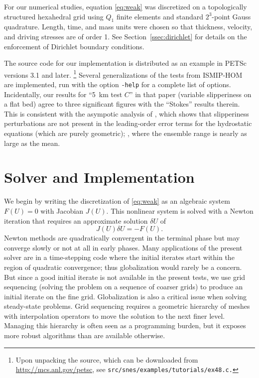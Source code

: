 For our numerical studies, equation \eqref{eq:weak} was discretized on a topologically structured hexahedral grid using $Q_1$ finite elements and standard $2^3$-point Gauss quadrature.  Length, time, and mass units were chosen so that thickness, velocity, and driving stresses are of order 1.  See Section~\ref{ssec:dirichlet} for details on the enforcement of Dirichlet boundary conditions.

The source code for our implementation is distributed as an example in PETSc~\citep{petsc-web-page} versions 3.1 and later.
\footnote{
Upon unpacking the source, which can be downloaded from \url{http://mcs.anl.gov/petsc}, see \texttt{src/snes/examples/tutorials/ex48.c.}
}
Several generalizations of the tests from ISMIP-HOM~\citep{pattyn2008beh} are implemented, run with the option \texttt{-help} for a complete list of options.  Incidentally, our results for ``\SI{5}{\kilo\metre} test $C$'' in that paper (variable slipperiness on a flat bed) agree to three significant figures with the ``Stokes'' results therein.
This is consistent with the asympotic analysis of \citet{schoof2010thin}, which shows that slipperiness perturbations are not present in the leading-order error terms for the hydrostatic equations (which are purely geometric); \cf \citet[Table~4 and Figure~8]{pattyn2008beh}, where the ensemble range is nearly as large as the mean.

\section{Solver and Implementation}\label{sec:solver}
We begin by writing the discretization of \eqref{eq:weak} as an algebraic system $F(U) = 0$ with
Jacobian $J(U)$.  This nonlinear system is solved with a Newton iteration that requires an
approximate solution $\delta U$ of
\begin{equation}\label{eq:newton-step}
  J(U)\delta U = -F(U) .
\end{equation}
Newton methods are quadratically convergent in the terminal phase but may converge slowly or
not at all in early phases.  Many applications of the present solver are in a time-stepping code
where the initial iterates start within the region of quadratic convergence; thus globalization
would rarely be a concern. But since a good initial iterate is not available in the present tests,
we use grid sequencing (solving the problem on a sequence of coarser grids) to produce an initial
iterate on the fine grid.
Globalization is also a critical issue when solving steady-state problems.
Grid sequencing requires a geometric hierarchy of meshes with interpolation operators to move the solution to the next finer level.
Managing this hierarchy is often seen as a programming burden, but it exposes more robust algorithms than are available otherwise.

